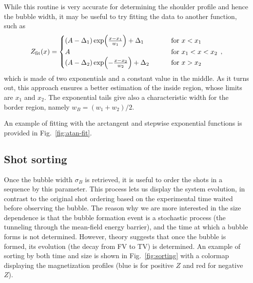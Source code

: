 While this routine is very accurate for determining the shoulder profile and hence the bubble width, it may be useful to try fitting the data to another function, such as
\begin{equation}
    Z_{\rm fit}(x) = 
    \begin{cases}
        (A-\Delta_1) \exp(\frac{x-x_1}{w_1}) + \Delta_1 \qquad\quad &\text{for } x < x_1\\
        A \qquad\qquad\qquad\qquad &\text{for } x_1 < x < x_2\\
        (A-\Delta_2) \exp(-\frac{x-x_2}{w_2}) + \Delta_2 \qquad &\text{for } x > x_2
    \end{cases}\, ,
    \label{eq:fit_exp}
\end{equation}
which is made of two exponentials and a constant value in the middle. As it turns out, this approach ensures a better estimation of the inside region, whose limits are $x_1$ and $x_2$. The exponential tails give also a characteristic width for the border region, namely $w_B = (w_1 + w_2)/2$.

An example of fitting with the arctangent and stepwise exponential functions is provided in Fig.\ \ref{fig:atan-fit}.

\subsection{Shot sorting}
Once the bubble width $\sigma_B$ is retrieved, it is useful to order the shots in a sequence by this parameter. This process lets us display the system evolution, in contrast to the original shot ordering based on the experimental time waited before observing the bubble. The reason why we are more interested in the size dependence is that the bubble formation event is a stochastic process (the tunneling through the mean-field energy barrier), and the time at which a bubble forms is not determined. However, theory suggests that once the bubble is formed, its evolution (the decay from FV to TV) is determined. 
An example of sorting by both time and size is shown in Fig.\ \ref{fig:sorting} with a colormap displaying the magnetization profiles (blue is for positive $Z$ and red for negative $Z$).

